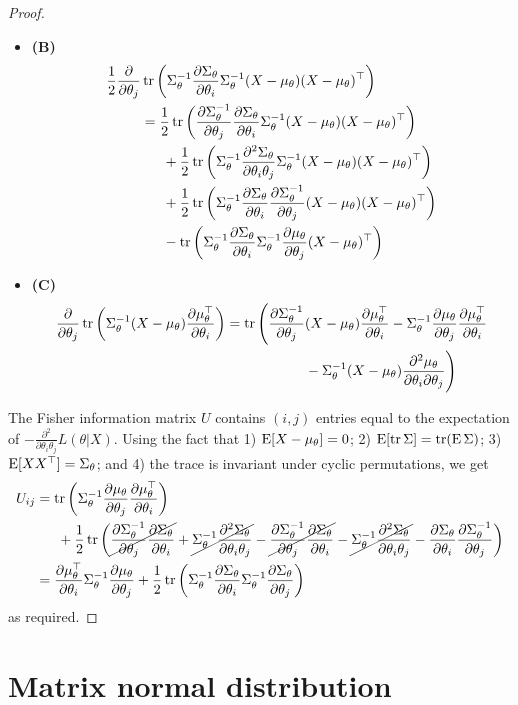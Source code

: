 \begin{proof}
\begin{itemize}
  \item \textbf{(B)}
  \begin{align*}
    \half \frac{\partial}{\partial \theta_j}  
    &\tr \left( 
    \Sigma_\theta^{-1} \dSi \Sigma_\theta^{-1} \Xmu\Xmu^\top 
    \right)  \\
    &= \half \tr \left( 
    \dSjnv \dSi \Sigma_\theta^{-1} \Xmu\Xmu^\top
    \right) \\
    &\phantom{==} +\half \tr \left( 
    \Sigma_\theta^{-1} \dStwo \Sigma_\theta^{-1} \Xmu\Xmu^\top
    \right) \\
    &\phantom{==} +\half \tr \left( 
    \Sigma_\theta^{-1} \dSi \dSjnv \Xmu\Xmu^\top
    \right) \\
    &\phantom{==} - \tr \left( 
    \Sigma_\theta^{-1} \dSi \Sigma_\theta^{-1} \dmuj\Xmu^\top
    \right)
  \end{align*}
  
  \item \textbf{(C)}
  \begin{align*}
    \frac{\partial}{\partial \theta_j}  \tr \left( 
    \Sigma_\theta^{-1}\Xmu\dmuitop 
    \right) 
    &= \tr \Bigg( 
    \dSjnv \Xmu\dmuitop 
    -
    \Sigma_\theta^{-1} \dmuj \dmuitop \\
    &\hspace{2cm} - \Sigma_\theta^{-1}\Xmu\dmutwo \Bigg)
  \end{align*}
\end{itemize}

The Fisher information matrix $U$ contains $(i,j)$ entries equal to the expectation of $-\frac{\partial^2}{\partial \theta_i\theta_j} L(\theta|X)$. 
Using the fact that 1) $\E[X-\mu_\theta]=0$; 2) $\E [\tr \Sigma] = \tr (\E \Sigma)$; 3) $\E [XX^\top] = \Sigma_\theta$; and 4) the trace is invariant under cyclic permutations, we get
\begin{align*}
  U_{ij} 
  &= \tr \left( \Sigma_\theta^{-1} \dmuj \dmuitop \right)   \\
  &\phantom{==} + \half \tr \left( 
  \cancel{\dSjnv \dSi} + \cancel{\Sigma_\theta^{-1}\dStwo}
  - \cancel{\dSjnv \dSi}  - \cancel{\Sigma_\theta^{-1}\dStwo} -  \dSi\dSjnv \right) \\
  &=  \dmuitop \Sigma_\theta^{-1} \dmuj + \half \tr \left(\Sigma_\theta^{-1} \dSi \Sigma_\theta^{-1} \dSj \right)
\end{align*}
as required.  \qedhere

\end{proof}

\section{Matrix normal distribution}
\label{apx:matrixnormal}

